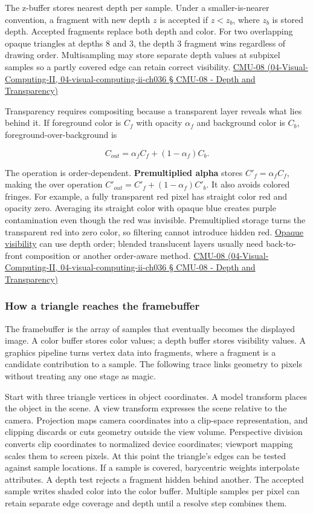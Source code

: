 The z-buffer stores nearest depth per sample. Under a smaller-is-nearer convention, a fragment with new depth \(z\) is accepted if \(z<z_b\), where \(z_b\) is stored depth. Accepted fragments replace both depth and color. For two overlapping opaque triangles at depths 8 and 3, the depth 3 fragment wins regardless of drawing order. Multisampling may store separate depth values at subpixel samples so a partly covered edge can retain correct visibility. \href{}{CMU-08 (04-Visual-Computing-II, 04-visual-computing-ii-ch036 § CMU-08 - Depth and Transparency)}

Transparency requires compositing because a transparent layer reveals what lies behind it. If foreground color is \(C_f\) with opacity \(\alpha_f\) and background color is \(C_b\), foreground-over-background is

\[
C_{out}=\alpha_fC_f+(1-\alpha_f)C_b.
\]

The operation is order-dependent. \textbf{Premultiplied alpha} stores \(C'_f=\alpha_fC_f\), making the over operation \(C'_{out}=C'_f+(1-\alpha_f)C'_b\). It also avoids colored fringes. For example, a fully transparent red pixel has straight color red and opacity zero. Averaging its straight color with opaque blue creates purple contamination even though the red was invisible. Premultiplied storage turns the transparent red into zero color, so filtering cannot introduce hidden red. \hyperref[appendix-97578ed97952]{Opaque visibility} can use depth order; blended translucent layers usually need back-to-front composition or another order-aware method. \href{}{CMU-08 (04-Visual-Computing-II, 04-visual-computing-ii-ch036 § CMU-08 - Depth and Transparency)}

\subsubsection{How a triangle reaches the framebuffer}\label{how-a-triangle-reaches-the-framebuffer}

The framebuffer is the array of samples that eventually becomes the displayed image. A color buffer stores color values; a depth buffer stores visibility values. A graphics pipeline turns vertex data into fragments, where a fragment is a candidate contribution to a sample. The following trace links geometry to pixels without treating any one stage as magic.

Start with three triangle vertices in object coordinates. A model transform places the object in the scene. A view transform expresses the scene relative to the camera. Projection maps camera coordinates into a clip-space representation, and clipping discards or cuts geometry outside the view volume. Perspective division converts clip coordinates to normalized device coordinates; viewport mapping scales them to screen pixels. At this point the triangle's edges can be tested against sample locations. If a sample is covered, barycentric weights interpolate attributes. A depth test rejects a fragment hidden behind another. The accepted sample writes shaded color into the color buffer. Multiple samples per pixel can retain separate edge coverage and depth until a resolve step combines them.

